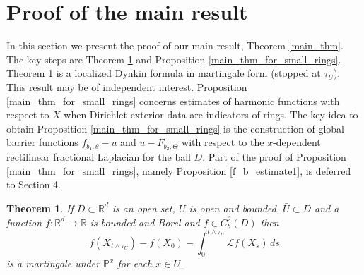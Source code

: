 \documentclass[a4paper,12pt,reqno]{amsart}
\newtheorem{theorem}{Theorem}[section]
\theoremstyle{definition}
\theoremstyle{remark}
\newcommand{\calL}{\mathcal{L}}
\newcommand{\Pp}{\mathds{P}} %
\newcommand{\R}{\mathds{R}}
\begin{document}
 
\section{Proof of the main result}
In this section we present the proof of our main result, Theorem \ref{main_thm}. The key steps are Theorem \ref{Lharmonic_in_U} and Proposition \ref{main_thm_for_small_rings}. Theorem \ref{Lharmonic_in_U} is a localized Dynkin formula in martingale form (stopped at $\tau_U$). This result may be of independent interest. Proposition \ref{main_thm_for_small_rings} concerns estimates of harmonic functions with respect to $X$ when Dirichlet exterior data are indicators of rings. The key idea to obtain Proposition \ref{main_thm_for_small_rings} is the construction of global barrier functions $f_{b_1,\theta} - u$ and $u-F_{b_2,\Theta}$ with respect to the $x$-dependent rectilinear fractional Laplacian for the ball $D$. Part of the proof of Proposition \ref{main_thm_for_small_rings}, namely Proposition \ref{f_b_estimate1}, is deferred to Section 4.
\begin{theorem}
\label{Lharmonic_in_U}
If $D \subset \R^d$ is an open set, $U$ is open and bounded, $\bar U\subset D$ and a function $f:\R^d \to \R$ is bounded and Borel and $f \in C_b^2(D)$ then
$$
f(X_{t \wedge \tau_U}) - f(X_0) - \int_0^{t \wedge \tau_U} \calL f(X_s) \, ds
$$
is a martingale under $\Pp^x$ for each $x\in U$.
\end{theorem}
\end{document}
